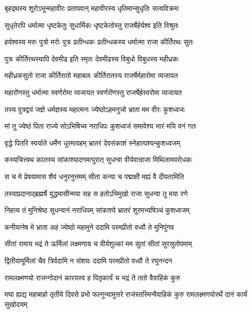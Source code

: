 \twolineshloka
{बृहद्रथस्य शूरोऽभून्महावीरः प्रतापवान्}
{महावीरस्य धृतिमान्सुधृतिः सत्यविक्रमः} %

\twolineshloka
{सुधृतेरपि धर्मात्मा धृष्टकेतुः सुधार्मिकः}
{धृष्टकेतोस्तु राजर्षेर्हर्यश्व इति विश्रुतः} %

\twolineshloka
{हर्यश्वस्य मरुः पुत्रो मरोः पुत्रः प्रतीन्धकः}
{प्रतीन्धकस्य धर्मात्मा राजा कीर्तिरथः सुतः} %

\twolineshloka
{पुत्रः कीर्तिरथस्यापि देवमीढ इति स्मृतः}
{देवमीढस्य विबुधो विबुधस्य महीध्रकः} %

\twolineshloka
{महीध्रकसुतो राजा कीर्तिरातो महाबलः}
{कीर्तिरातस्य राजर्षेर्महारोमा व्यजायत} %

\twolineshloka
{महारोंणस्तु धर्मात्मा स्वर्णरोमा व्यजायत}
{स्वर्णरोंणस्तु राजर्षेर्ह्रस्वरोमा व्यजायत} %

\twolineshloka
{तस्य पुत्रद्वयं जज्ञे धर्मज्ञस्य महात्मनः}
{ज्येष्ठोऽहमनुजो भ्राता मम वीरः कुशध्वजः} %

\twolineshloka
{मां तु ज्येष्ठं पिता राज्ये सोऽभिषिच्य नराधिपः}
{कुशध्वजं समावेश्य भारं मयि वनं गतः} %

\twolineshloka
{वृद्धे पितरि स्वर्याते धर्मेण धुरमावहम्}
{भ्रातरं देवसंकाशं स्नेहात्पश्यन्कुशध्वजम्} %

\twolineshloka
{कस्यचित्त्वथ कालस्य सांकाश्यादगमत्पुरात्}
{सुधन्वा वीर्यवान्राजा मिथिलामवरोधकः} %

\twolineshloka
{स च मे प्रेषयामास शैवं धनुरनुत्तमम्}
{सीता कन्या च पद्माक्षी मह्यं वै दीयतामिति} %

\twolineshloka
{तस्याप्रदानाद्ब्रह्मर्षे युद्धमासीन्मया सह}
{स हतोऽभिमुखो राजा सुधन्वा तु मया रणे} %

\twolineshloka
{निहत्य तं मुनिश्रेष्ठ सुधन्वानं नराधिपम्}
{सांकाश्ये भ्रातरं शूरमभ्यषिञ्चं कुशध्वजम्} %

\twolineshloka
{कनीयानेष मे भ्राता अहं ज्येष्ठो महामुने}
{ददामि परमप्रीतो वध्वौ ते मुनिपुंगव} %

\twolineshloka
{सीतां रामाय भद्रं ते ऊर्मिलां लक्ष्मणाय च}
{वीर्यशुल्कां मम सुतां सीतां सुरसुतोपमाम्} %

\twolineshloka
{द्वितीयामूर्मिलां चैव त्रिर्वदामि न संशयः}
{ददामि परमप्रीतो वध्वौ ते रघुनन्दन} %

\twolineshloka
{रामलक्ष्मणयो राजन्गोदानं कारयस्व ह}
{पितृकार्यं च भद्रं ते ततो वैवाहिकं कुरु} %

\threelineshloka
{मघा ह्यद्य महाबाहो तृतीये दिवसे प्रभो}
{फल्गुन्यामुत्तरे राजंस्तस्मिन्वैवाहिकं कुरु}
{रामलक्ष्मणयोरर्थे दानं कार्यं सुखोदयम्} %


